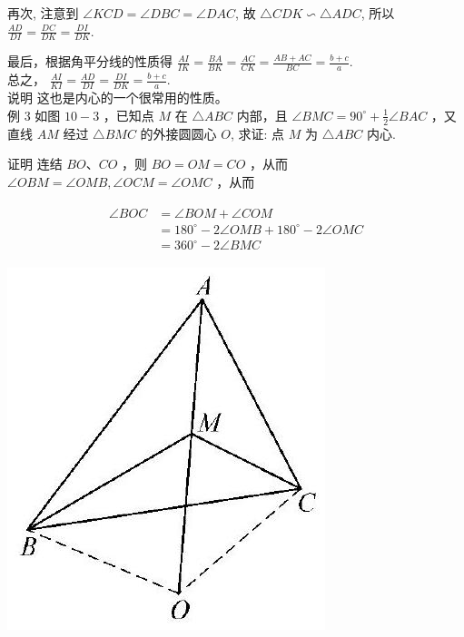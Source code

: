 \documentclass[10pt]{article}
\begin{document}
再次, 注意到 $\angle K C D=\angle D B C=\angle D A C$, 故 $\triangle C D K \backsim \triangle A D C$, 所以 $\frac{A D}{D I}=\frac{D C}{D K}=\frac{D I}{D K}$.

最后，根据角平分线的性质得 $\frac{A I}{I K}=\frac{B A}{B K}=\frac{A C}{C K}=\frac{A B+A C}{B C}=\frac{b+c}{a}$.\\
总之， $\frac{A I}{K I}=\frac{A D}{D I}=\frac{D I}{D K}=\frac{b+c}{a}$.\\
说明 这也是内心的一个很常用的性质。\\
例 3 如图 $10-3$ ，已知点 $M$ 在 $\triangle A B C$ 内部，且 $\angle B M C=90^{\circ}+\frac{1}{2} \angle B A C$ ，又直线 $A M$ 经过 $\triangle B M C$ 的外接圆圆心 $O$, 求证: 点 $M$ 为 $\triangle A B C$ 内心.

证明 连结 $B O 、 C O$ ，则 $B O=O M=C O$ ，从而 $\angle O B M=\angle O M B, \angle O C M=\angle O M C$ ，从而

\begin{align*}
\begin{aligned}
\angle B O C & =\angle B O M+\angle C O M \\
& =180^{\circ}-2 \angle O M B+180^{\circ}-2 \angle O M C \\
& =360^{\circ}-2 \angle B M C
\end{aligned}
\end{align*}

\begin{center}
\includegraphics[max width=\textwidth]{2024_10_30_66b8e5e701da2093c133g-072(1)}
\end{center}
\end{document}
